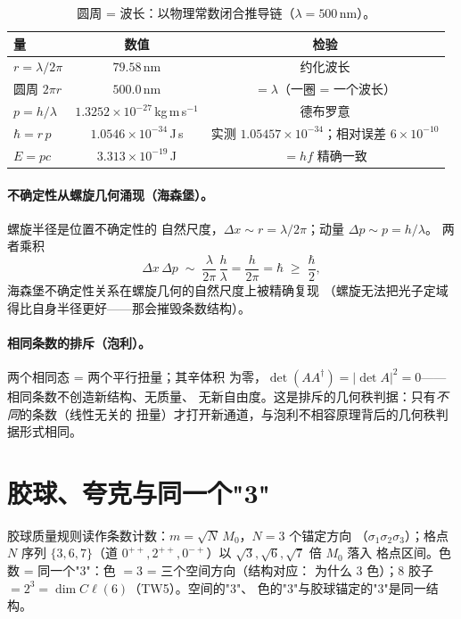 \documentclass[aps,prd,preprint,superscriptaddress,amsmath,amssymb]{revtex4-2}
\begin{document}
\begin{table}[htbp]
\caption{圆周 = 波长：以物理常数闭合推导链（$\lambda=500$\,nm）。}
\label{tab:circ}
\begin{ruledtabular}
\begin{tabular}{lcc}
量 & 数值 & 检验 \\
\hline
$r=\lambda/2\pi$ & $79.58$\,nm & 约化波长 \\
圆周 $2\pi r$ & $500.0$\,nm & $=\lambda$（一圈 = 一个波长） \\
$p=h/\lambda$ & $1.3252\times10^{-27}$\,kg\,m\,s$^{-1}$ & 德布罗意 \\
$\hbar=r\,p$ & $1.0546\times10^{-34}$\,J\,s & 实测 $1.05457\times10^{-34}$；相对误差 $6\times10^{-10}$ \\
$E=pc$ & $3.313\times10^{-19}$\,J & $=hf$ 精确一致 \\
\end{tabular}
\end{ruledtabular}
\end{table}

\paragraph{不确定性从螺旋几何涌现（海森堡）。} 螺旋半径是位置不确定性的
自然尺度，$\Delta x \sim r = \lambda/2\pi$；动量 $\Delta p \sim p = h/\lambda$。
两者乘积
\begin{equation}
\Delta x\,\Delta p \;\sim\; \frac{\lambda}{2\pi}\,\frac{h}{\lambda}
= \frac{h}{2\pi} = \hbar \;\ge\; \frac{\hbar}{2},
\end{equation}
海森堡不确定性关系\cite{heisenberg1927anschaulichen}在螺旋几何的自然尺度上被精确复现
（螺旋无法把光子定域得比自身半径更好——那会摧毁条数结构）。

\paragraph{相同条数的排斥（泡利）。} 两个相同态 = 两个平行扭量；其辛体积
为零，$\det(AA^\dagger)=|\det A|^2=0$——相同条数不创造新结构、无质量、
无新自由度。这是排斥的几何秩判据：只有\emph{不同}的条数（线性无关的
扭量）才打开新通道，与泡利不相容原理背后的几何秩判据形式相同\cite{pauli1925zusammenhang}。

\section{胶球、夸克与同一个"3"}
\label{sec:glueball}

胶球质量规则读作条数计数：$m=\sqrt{N}\,M_0$，$N=3$ 个锚定方向
（$\sigma_1\sigma_2\sigma_3$）；格点 $N$ 序列 $\{3,6,7\}$\cite{morningstar1999glueball,chen2006glueball,navas2024review}（道
$0^{++},2^{++},0^{-+}$）以 $\sqrt{3},\sqrt{6},\sqrt{7}$ 倍 $M_0$ 落入
格点区间。色数 = 同一个"3"：色 $=3$ = 三个空间方向（结构对应：
为什么 3 色）；8 胶子 $= 2^3 = \dim C\ell(6)$（TW5）。空间的"3"、
色的"3"与胶球锚定的"3"是同一结构。
\end{document}

